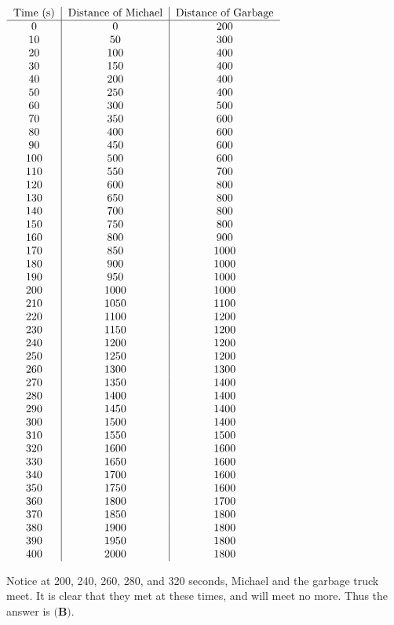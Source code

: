 \begin{enumerate}
 $\begin{tabular}{c|c|c}Time (s) &Distance of Michael&Distance of Garbage\\ \hline 0&0&200\\ 10&50&300\\ 20&100&400\\ 30&150&400\\ 40&200&400\\ 50&250&400\\ 60&300&500\\ 70&350&600\\ 80&400&600\\ 90&450&600\\ 100&500&600\\ 110&550&700\\ 120&600&800\\ 130&650&800\\ 140&700&800\\ 150&750&800\\ 160&800&900\\ 170&850&1000\\ 180&900&1000\\ 190&950&1000\\ 200&1000&1000\\ 210&1050&1100\\ 220&1100&1200\\ 230&1150&1200\\ 240&1200&1200\\ 250&1250&1200\\ 260&1300&1300\\ 270&1350&1400\\ 280&1400&1400\\ 290&1450&1400\\ 300&1500&1400\\ 310&1550&1500\\ 320&1600&1600\\ 330&1650&1600\\ 340&1700&1600\\ 350&1750&1600\\ 360&1800&1700\\ 370&1850&1800\\ 380&1900&1800\\ 390&1950&1800\\ 400&2000&1800\\ \end{tabular}$

 
Notice at 200, 240, 260, 280, and 320 seconds, Michael and the garbage truck meet. It is clear that they met at these times, and will meet no more. Thus the answer is $\boxed{\textbf{(B)}}$.


\end{enumerate}

